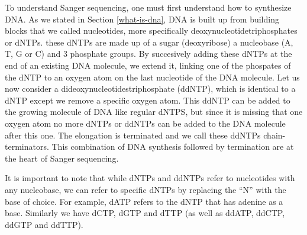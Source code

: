\documentclass[
  11pt,
  twoside,
  BCOR=10mm,
  listof=totoc]{scrbook}
\begin{document}
To understand Sanger sequencing, one must first understand how to synthesize DNA. As we stated in Section \ref{what-is-dna}, DNA is built up from building blocks that we called nucleotides, more specifically deoxynucleotidetriphosphates or dNTPs. these dNTPs are made up of a sugar (deoxyribose) a nucleobase (A, T, G or C) and 3 phosphate groups. By succesively adding these dNTPs at the end of an existing DNA molecule, we extend it, linking one of the phospates of the dNTP to an oxygen atom on the last nucleotide of the DNA molecule. Let us now consider a dideoxynucleotidestriphosphate (ddNTP), which is identical to a dNTP except we remove a specific oxygen atom. This ddNTP can be added to the growing molecule of DNA like regular dNTPS, but since it is missing that one oxygen atom no more dNTPs or ddNTPs can be added to the DNA molecule after this one. The elongation is terminated and we call these ddNTPs chain-terminators. This combination of DNA synthesis followed by termination are at the heart of Sanger sequencing.

It is important to note that while dNTPs and ddNTPs refer to nucleotides with any nucleobase, we can refer to specific dNTPs by replacing the ``N'' with the base of choice. For example, dATP refers to the dNTP that has adenine as a base. Similarly we have dCTP, dGTP and dTTP (as well as ddATP, ddCTP, ddGTP and ddTTP).
\end{document}
